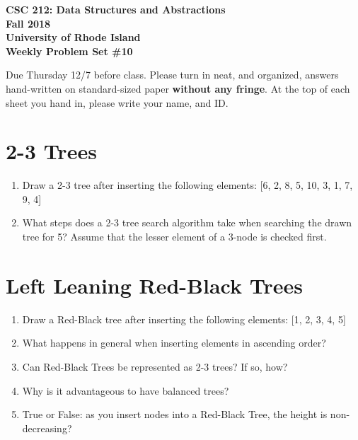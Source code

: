 \documentclass[11pt]{article}
\begin{document}
    \thispagestyle{empty}
    
    \begin{center}
        {\Large\bf CSC 212: Data Structures and Abstractions}\\
        \medskip
        {\Large\bf Fall 2018}\\
        \medskip
        {\Large\bf University of Rhode Island}\\
        \bigskip
        {\Large\bf Weekly Problem Set \#10}
    \end{center}
    
    Due Thursday 12/7 before class. Please turn in neat, and organized, answers hand-written on standard-sized paper \textbf{without any fringe}. At the top of each sheet you hand in, please write your name, and ID.
    \section{2-3 Trees}
\begin{enumerate}
    \item Draw a 2-3 tree after inserting the following elements: [6, 2, 8, 5, 10, 3, 1, 7, 9, 4]

    \item What steps does a 2-3 tree search algorithm take when searching the drawn tree for 5? Assume that the lesser element of a 3-node is checked first.
\end{enumerate}

\section{Left Leaning Red-Black Trees}
\begin{enumerate}
    \item Draw a Red-Black tree after inserting the following elements: [1, 2, 3, 4, 5]
    
    \item What happens in general when inserting elements in ascending order?
    
    \item Can Red-Black Trees be represented as 2-3 trees? If so, how?

    \item Why is it advantageous to have balanced trees?

    \item True or False: as you insert nodes into a Red-Black Tree, the height is non-decreasing?
    
\end{enumerate}
    
    \label{r:lastpage}
    
    
\end{document}

